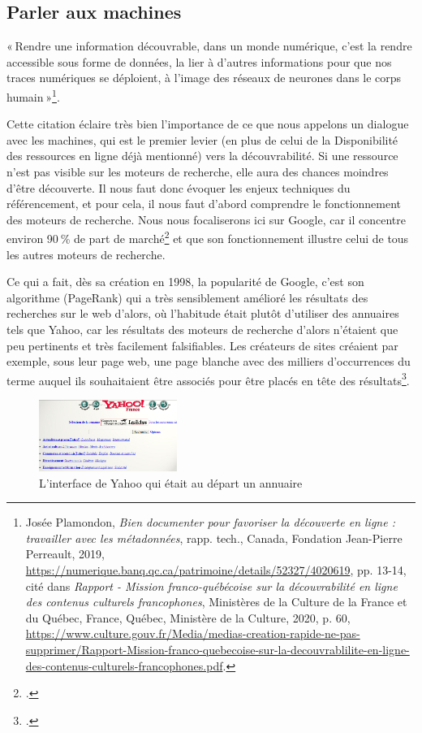 \subsection*{Parler aux machines}
« Rendre une information découvrable, dans un monde numérique, c’est la rendre accessible sous forme de données, la lier à d’autres informations pour que nos traces numériques se déploient, à l’image des réseaux de neurones dans le corps humain »\footnote{Josée Plamondon, \textit{Bien documenter pour favoriser la découverte en ligne : travailler avec les métadonnées}, rapp. tech., Canada, Fondation Jean-Pierre Perreault, 2019, \url{https://numerique.banq.qc.ca/patrimoine/details/52327/4020619}, pp. 13-14, cité dans \textit{Rapport - Mission franco-québécoise sur la découvrabilité en ligne des contenus culturels francophones}, Ministères de la Culture de la France et du Québec, France, Québec, Ministère de la Culture, 2020, p. 60, \url{https://www.culture.gouv.fr/Media/medias-creation-rapide-ne-pas-supprimer/Rapport-Mission-franco-quebecoise-sur-la-decouvrablilite-en-ligne-des-contenus-culturels-francophones.pdf}.}.

Cette citation éclaire très bien l’importance de ce que nous appelons un dialogue avec les machines, qui est le premier levier (en plus de celui de la Disponibilité des ressources en ligne déjà mentionné) vers la découvrabilité. Si une ressource n’est pas visible sur les moteurs de recherche, elle aura des chances moindres d’être découverte. Il nous faut donc évoquer les enjeux techniques du référencement, et pour cela, il nous faut d’abord comprendre le fonctionnement des moteurs de recherche. Nous nous focaliserons ici sur Google, car il concentre environ 90 \% de part de marché\footcite{zotero-245} et que son fonctionnement illustre celui de tous les autres moteurs de recherche. 

Ce qui a fait, dès sa création en 1998, la popularité de Google, c’est son algorithme (PageRank) qui a très sensiblement amélioré les résultats des recherches sur le web d’alors, où l’habitude était plutôt d’utiliser des annuaires tels que Yahoo, car les résultats des moteurs de recherche d’alors n’étaient que peu pertinents et très facilement falsifiables. Les créateurs de sites créaient par exemple, sous leur page web, une page blanche avec des milliers d’occurrences du terme auquel ils souhaitaient être associés pour être placés en tête des résultats\footcite[§ 4]{cardon2013}.


\begin{figure}[h!]
	\centering
	\includegraphics[width=0.4\textwidth]{images/image2.jpg}
	\caption{L'interface de Yahoo qui était au départ un annuaire }
	\label{fig:image2}
\end{figure}



